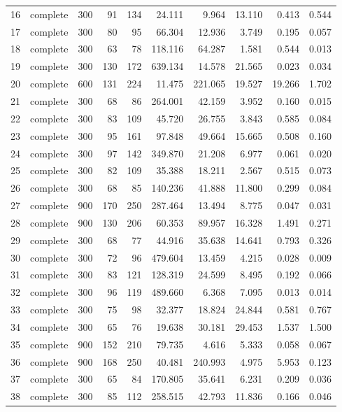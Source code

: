 \begin{longtable}{rcrrrrrrrr}
16 & complete & 300 & 91 & 134 & 24.111 & 9.964 & 13.110 & 0.413 & 0.544 \\
17 & complete & 300 & 80 & 95 & 66.304 & 12.936 & 3.749 & 0.195 & 0.057 \\
18 & complete & 300 & 63 & 78 & 118.116 & 64.287 & 1.581 & 0.544 & 0.013 \\
19 & complete & 300 & 130 & 172 & 639.134 & 14.578 & 21.565 & 0.023 & 0.034 \\
20 & complete & 600 & 131 & 224 & 11.475 & 221.065 & 19.527 & 19.266 & 1.702 \\
21 & complete & 300 & 68 & 86 & 264.001 & 42.159 & 3.952 & 0.160 & 0.015 \\
22 & complete & 300 & 83 & 109 & 45.720 & 26.755 & 3.843 & 0.585 & 0.084 \\
23 & complete & 300 & 95 & 161 & 97.848 & 49.664 & 15.665 & 0.508 & 0.160 \\
24 & complete & 300 & 97 & 142 & 349.870 & 21.208 & 6.977 & 0.061 & 0.020 \\
25 & complete & 300 & 82 & 109 & 35.388 & 18.211 & 2.567 & 0.515 & 0.073 \\
26 & complete & 300 & 68 & 85 & 140.236 & 41.888 & 11.800 & 0.299 & 0.084 \\
27 & complete & 900 & 170 & 250 & 287.464 & 13.494 & 8.775 & 0.047 & 0.031 \\
28 & complete & 900 & 130 & 206 & 60.353 & 89.957 & 16.328 & 1.491 & 0.271 \\
29 & complete & 300 & 68 & 77 & 44.916 & 35.638 & 14.641 & 0.793 & 0.326 \\
30 & complete & 300 & 72 & 96 & 479.604 & 13.459 & 4.215 & 0.028 & 0.009 \\
31 & complete & 300 & 83 & 121 & 128.319 & 24.599 & 8.495 & 0.192 & 0.066 \\
32 & complete & 300 & 96 & 119 & 489.660 & 6.368 & 7.095 & 0.013 & 0.014 \\
33 & complete & 300 & 75 & 98 & 32.377 & 18.824 & 24.844 & 0.581 & 0.767 \\
34 & complete & 300 & 65 & 76 & 19.638 & 30.181 & 29.453 & 1.537 & 1.500 \\
35 & complete & 900 & 152 & 210 & 79.735 & 4.616 & 5.333 & 0.058 & 0.067 \\
36 & complete & 900 & 168 & 250 & 40.481 & 240.993 & 4.975 & 5.953 & 0.123 \\
37 & complete & 300 & 65 & 84 & 170.805 & 35.641 & 6.231 & 0.209 & 0.036 \\
38 & complete & 300 & 85 & 112 & 258.515 & 42.793 & 11.836 & 0.166 & 0.046 \\

\end{longtable}
